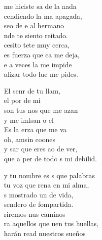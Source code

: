 \begin{cancion}%
	 me hiciste sa de la nada \\
	cendiendo la ma apagada,\\
	seo de e al hermano\\
	nde te siento reitado.\\
	\jump
	cesito tete muy cerca,\\
	es fuerza que ca me deja,\\
	e a veces la  me impide\\
	alizar todo lue me pides.\jump\\
	\begin{chorus}%
		El senr de tu llam,\\
		el por de mi\\
		son tus nos que me azan\\
		y me imlsan o el \\
		Es la erza que me va\\
		oh,  amsin coones\\
		y sar que eres ao de ver,\\
		que a per de todo s mi debilid.\jump\\
	\end{chorus}%
	y tu nombre es s que palabras\\
	 tu voz que rena en mi alma,\\
	s mostrado un  de vida,\\
	 sendero de fompartida.\\
	\jump
	riremos nus caminos \\
	ra aquellos que uen tus huellas,\\
	harán read nuestros sueños\\

\end{cancion}
